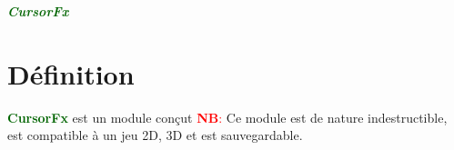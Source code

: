\documentclass[a4paper, 11pt]{article}
\begin{document}
	\pagecolor{silver}
	\huge{\hspace{12cm}\textit{\textbf{\textcolor{darkgreen}{CursorFx}}}}\large{} \tableofcontents \newpage
	\section{Définition}
	\textcolor{darkgreen}{\textbf{CursorFx}} est un module conçut 
	\textcolor{red}{\textbf{NB}:} Ce module est de nature indestructible, est compatible à un jeu 2D, 3D et 
	est sauvegardable.
\end{document}
